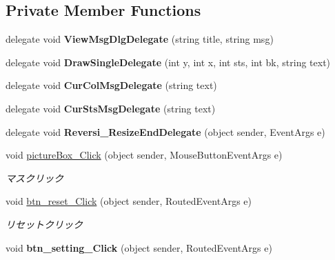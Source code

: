 \subsection*{Private Member Functions}
\begin{DoxyCompactItemize}
\item 
delegate void {\bfseries View\+Msg\+Dlg\+Delegate} (string title, string msg)\hypertarget{class_reversi4color_wpf_1_1_main_window_af7a6383c09300a4e2171b6eea4e21612}{}\label{class_reversi4color_wpf_1_1_main_window_af7a6383c09300a4e2171b6eea4e21612}

\item 
delegate void {\bfseries Draw\+Single\+Delegate} (int y, int x, int sts, int bk, string text)\hypertarget{class_reversi4color_wpf_1_1_main_window_ad205bd924bfb935dea867930734f6df7}{}\label{class_reversi4color_wpf_1_1_main_window_ad205bd924bfb935dea867930734f6df7}

\item 
delegate void {\bfseries Cur\+Col\+Msg\+Delegate} (string text)\hypertarget{class_reversi4color_wpf_1_1_main_window_a5733a1e142e99fd7fbf2697fb391501e}{}\label{class_reversi4color_wpf_1_1_main_window_a5733a1e142e99fd7fbf2697fb391501e}

\item 
delegate void {\bfseries Cur\+Sts\+Msg\+Delegate} (string text)\hypertarget{class_reversi4color_wpf_1_1_main_window_afb1b39c06d2e3ffca18b9c026fe5c88b}{}\label{class_reversi4color_wpf_1_1_main_window_afb1b39c06d2e3ffca18b9c026fe5c88b}

\item 
delegate void {\bfseries Reversi\+\_\+\+Resize\+End\+Delegate} (object sender, Event\+Args e)\hypertarget{class_reversi4color_wpf_1_1_main_window_a0e60e98e70f61ee056f56011ef6d2694}{}\label{class_reversi4color_wpf_1_1_main_window_a0e60e98e70f61ee056f56011ef6d2694}

\item 
void \hyperlink{class_reversi4color_wpf_1_1_main_window_abdd178ee605694145f7d214870176c07}{picture\+Box\+\_\+\+Click} (object sender, Mouse\+Button\+Event\+Args e)
\begin{DoxyCompactList}\small\item\em マスクリック \end{DoxyCompactList}\item 
void \hyperlink{class_reversi4color_wpf_1_1_main_window_a0ac7673de0ecfc247dd3224a9f999098}{btn\+\_\+reset\+\_\+\+Click} (object sender, Routed\+Event\+Args e)
\begin{DoxyCompactList}\small\item\em リセットクリック \end{DoxyCompactList}\item 
void {\bfseries btn\+\_\+setting\+\_\+\+Click} (object sender, Routed\+Event\+Args e)\hypertarget{class_reversi4color_wpf_1_1_main_window_a5443ded25f9782f8bb55fbc6a317af21}{}\label{class_reversi4color_wpf_1_1_main_window_a5443ded25f9782f8bb55fbc6a317af21}


\end{DoxyCompactItemize}
